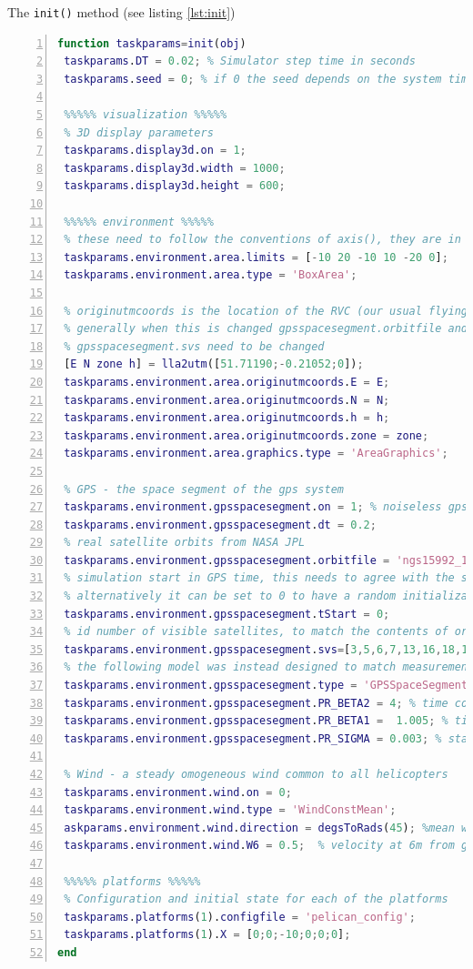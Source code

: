 \documentclass[a4paper,11pt]{report}
\begin{document}
The \texttt{init()} method (see listing \ref{lst:init}) 
\begin{lstlisting}[float=ht!bp,caption=TaskKeepSpot init() method,language=Matlab,frame=lines,label=lst:init,numbers=left,basicstyle=\small]
function taskparams=init(obj)  
 taskparams.DT = 0.02; % Simulator step time in seconds            
 taskparams.seed = 0; % if 0 the seed depends on the system time
            
 %%%%% visualization %%%%%
 % 3D display parameters
 taskparams.display3d.on = 1;
 taskparams.display3d.width = 1000;
 taskparams.display3d.height = 600;            
            
 %%%%% environment %%%%%
 % these need to follow the conventions of axis(), they are in m, Z down
 taskparams.environment.area.limits = [-10 20 -10 10 -20 0];
 taskparams.environment.area.type = 'BoxArea';
            
 % originutmcoords is the location of the RVC (our usual flying site)
 % generally when this is changed gpsspacesegment.orbitfile and 
 % gpsspacesegment.svs need to be changed
 [E N zone h] = lla2utm([51.71190;-0.21052;0]);
 taskparams.environment.area.originutmcoords.E = E;
 taskparams.environment.area.originutmcoords.N = N;
 taskparams.environment.area.originutmcoords.h = h;
 taskparams.environment.area.originutmcoords.zone = zone;
 taskparams.environment.area.graphics.type = 'AreaGraphics';
            
 % GPS - the space segment of the gps system
 taskparams.environment.gpsspacesegment.on = 1; % noiseless gps if 0
 taskparams.environment.gpsspacesegment.dt = 0.2;
 % real satellite orbits from NASA JPL
 taskparams.environment.gpsspacesegment.orbitfile = 'ngs15992_16to17.sp3';
 % simulation start in GPS time, this needs to agree with the sp3 file above, 
 % alternatively it can be set to 0 to have a random initialization 
 taskparams.environment.gpsspacesegment.tStart = 0;             
 % id number of visible satellites, to match the contents of orbitfile
 taskparams.environment.gpsspacesegment.svs=[3,5,6,7,13,16,18,19,20,22,24,29,31];
 % the following model was instead designed to match measurements of real data
 taskparams.environment.gpsspacesegment.type = 'GPSSpaceSegmentGM2';            
 taskparams.environment.gpsspacesegment.PR_BETA2 = 4; % time constant
 taskparams.environment.gpsspacesegment.PR_BETA1 =  1.005; % time constant   
 taskparams.environment.gpsspacesegment.PR_SIGMA = 0.003; % standard deviation            
            
 % Wind - a steady omogeneous wind common to all helicopters
 taskparams.environment.wind.on = 0;
 taskparams.environment.wind.type = 'WindConstMean';
 askparams.environment.wind.direction = degsToRads(45); %mean wind direction
 taskparams.environment.wind.W6 = 0.5;  % velocity at 6m from ground in m/s
            
 %%%%% platforms %%%%%
 % Configuration and initial state for each of the platforms
 taskparams.platforms(1).configfile = 'pelican_config';
 taskparams.platforms(1).X = [0;0;-10;0;0;0];       
end
\end{lstlisting}
\end{document}
